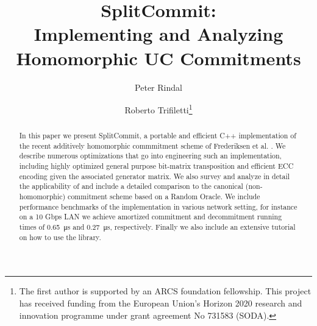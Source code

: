 \documentclass[letterpaper]{llncs}
\begin{document}
	
	\title{SplitCommit:\\ Implementing and Analyzing Homomorphic UC Commitments%
	}
	
	
	\author{
		Peter Rindal \and Roberto Trifiletti\thanks{The first author is supported by an ARCS foundation fellowship. This project has received funding from the European Union's Horizon 2020 research and innovation programme under grant agreement No 731583 (SODA).}
		}

	\date{}

	\maketitle
	

	
	\begin{abstract}
	In this paper we present SplitCommit, a portable and efficient C++ implementation of the recent additively homomorphic commmitment scheme of Frederiksen et al. \cite{DBLP:conf/tcc/FrederiksenJNT16}. We describe numerous optimizations that go into engineering such an implementation, including highly optimized general purpose bit-matrix transposition and efficient ECC encoding given the associated generator matrix. We also survey and analyze in detail the applicability of \cite{DBLP:conf/tcc/FrederiksenJNT16} and include a detailed comparison to the canonical (non-homomorphic) commitment scheme based on a Random Oracle. We include performance benchmarks of the implementation in various network setting, for instance on a 10 Gbps LAN we achieve amortized commitment and decommitment running times of \SI{0.65}{\micro\second} and \SI{0.27}{\micro\second}, respectively. Finally we also include an extensive tutorial on how to use the library.

	\end{abstract}
	
	
	\pagestyle{plain}
	
	
	
	
	

	
	
	
	
	
	
	
	
	
	
\end{document}
